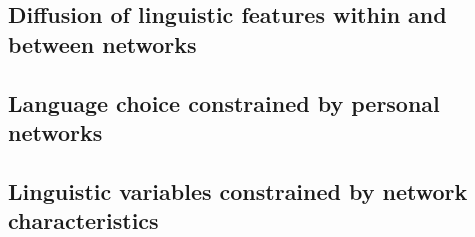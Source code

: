     \subsection{Diffusion of linguistic features within and between networks}
    \subsection{Language choice constrained by personal networks}
    \subsection{Linguistic variables constrained by network characteristics}
